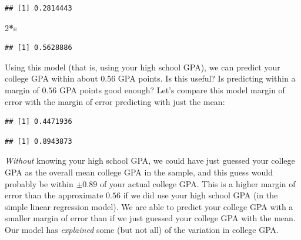 \documentclass[
]{book}
\newenvironment{Shaded}{\begin{snugshade}}{\end{snugshade}}
\newcommand{\DecValTok}[1]{\textcolor[rgb]{0.00,0.00,0.81}{#1}}
\newcommand{\KeywordTok}[1]{\textcolor[rgb]{0.13,0.29,0.53}{\textbf{#1}}}
\newcommand{\NormalTok}[1]{#1}
\newcommand{\OperatorTok}[1]{\textcolor[rgb]{0.81,0.36,0.00}{\textbf{#1}}}
\begin{document}
\begin{verbatim}
## [1] 0.2814443
\end{verbatim}

\begin{Shaded}
\begin{Highlighting}[]
\DecValTok{2}\OperatorTok{*}\NormalTok{s}
\end{Highlighting}
\end{Shaded}

\begin{verbatim}
## [1] 0.5628886
\end{verbatim}

Using this model (that is, using your high school GPA), we can predict your college GPA within about \(0.56\) GPA points. Is this useful? Is predicting within a margin of \(0.56\) GPA points good enough? Let's compare this model margin of error with the margin of error predicting with just the mean:

\begin{Shaded}
\end{Shaded}

\begin{verbatim}
## [1] 0.4471936
\end{verbatim}

\begin{Shaded}
\end{Shaded}

\begin{verbatim}
## [1] 0.8943873
\end{verbatim}

\emph{Without} knowing your high school GPA, we could have just guessed your college GPA as the overall mean college GPA in the sample, and this guess would probably be within \(\pm 0.89\) of your actual college GPA. This is a higher margin of error than the approximate \(0.56\) if we did use your high school GPA (in the simple linear regression model). We are able to predict your college GPA with a smaller margin of error than if we just guessed your college GPA with the mean. Our model has \emph{explained} some (but not all) of the variation in college GPA.
\end{document}
